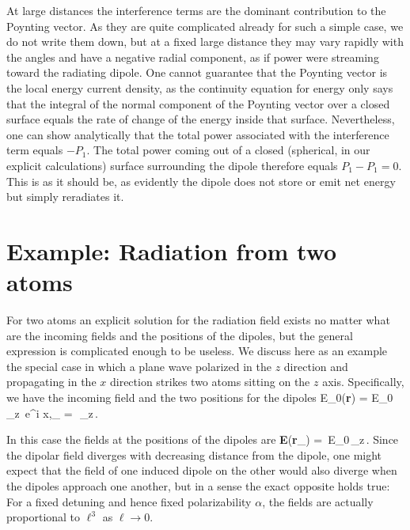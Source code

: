At large distances the interference terms are the dominant contribution to the Poynting vector. As they are quite complicated already for such a simple case, we do not write them down, but at a fixed large distance they may vary rapidly with the angles and have a negative radial component, as if power were streaming toward the radiating dipole. One cannot guarantee that the Poynting vector is the local energy current density, as the continuity equation for energy only says that the integral of the normal component of the Poynting vector over a closed surface equals the rate of change of the energy inside that surface. Nevertheless, one can  show analytically that the total power associated with the interference term equals $-P_1$. The total power coming  out of a closed (spherical, in our explicit calculations) surface surrounding the dipole therefore equals $P_1-P_1=0$. This is as it should be, as evidently the dipole does not store or emit net energy but simply reradiates it.

\section{Example: Radiation from two atoms}
For two atoms an explicit solution for the radiation field exists no matter what are the incoming fields and the positions of the dipoles, but the general expression is complicated enough to be useless. We discuss here as an example the special case in which a plane wave polarized in the $z$ direction and propagating in the $x$ direction strikes two atoms sitting on the $z$ axis. Specifically, we have the incoming field and the two positions for the dipoles
\beq
E_0({\bf r}) = E_0\, _z\,  e^{i x},_{\pm} = \pm\half\,\ell\,_z\,.
\eeq

In this case the fields at the positions of the dipoles are
\beq
{\bf E}({\bf r}_\pm) = \,E_0\,_z\,.
\label{FOD}
\eeq
Since the dipolar field diverges with decreasing distance from the dipole, one might expect that the field of one induced dipole on the other would also diverge when the dipoles approach one another, but in a sense the exact opposite holds true: For a fixed detuning and hence fixed polarizability $\alpha$, the fields are actually proportional to $\ell^3$ as $\ell\rightarrow0$.

